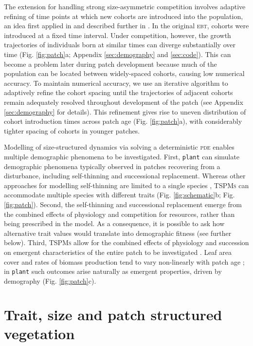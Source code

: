 \documentclass[a4paper,11pt]{article}
\newcommand{\plant}{\texttt{plant}}
\begin{document}
The extension for handling strong size-asymmetric competition involves
adaptive refining of time points at which new cohorts are introduced
into the population, an idea first applied in \citet{Falster-2011} and
described further in \citet{Falster-2015}.
In the original \textsc{ebt}, cohorts were introduced at a fixed time
interval. Under competition, however, the growth
trajectories of individuals born at similar times can diverge
substantially over time (Fig. \ref{fig:patch}a; Appendix
\ref{sec:demography} and \ref{sec:code}). This can become a problem later during patch
development because much of the population can be located between
widely-spaced cohorts, causing low numerical accuracy. To maintain
numerical accuracy, we use an iterative algorithm to adaptively refine
the cohort spacing until the trajectories of adjacent cohorts remain
adequately resolved throughout development of the patch (see Appendix
\ref{sec:demography} for details). This refinement gives rise to uneven
distribution of cohort introduction times across patch age (Fig.
\ref{fig:patch}a), with considerably tighter spacing of cohorts in
younger patches.

Modelling of size-structured dynamics via solving a deterministic
\textsc{pde} enables multiple demographic phenomena to be
investigated. First, {\plant} can simulate demographic
phenomena typically observed in patches
recovering from a disturbance, including self-thinning and
successional replacement. Whereas other approaches for modelling
self-thinning are limited to a single species
\citep[e.g.][]{Barnes-2004, Coomes-2007}, \textsc{TSPMs} can accommodate
multiple species with different traits (Fig. \ref{fig:schematic}b;
Fig.  \ref{fig:patch}). Second, the self-thinning and
successional replacement emerge from the
combined effects of physiology and competition for resources, rather
than being prescribed in the model. As a consequence, it is possible to ask how alternative trait values would translate into demographic fitness (see further below). Third,  \textsc{TSPMs} allow for the combined effects of physiology and succession on emergent
characteristics of the entire patch to be investigated
\citep{Moorcroft-2001, Falster-2011}. Leaf area cover and rates of biomass
production tend to vary  non-linearly with patch
age \citep{Smith-2001, Binkley-2002, Ogawa-2010};
in {\plant} such outcomes arise naturally as emergent properties,
driven by demography (Fig. \ref{fig:patch}c).

\section{Trait, size and patch structured vegetation}
\end{document}
